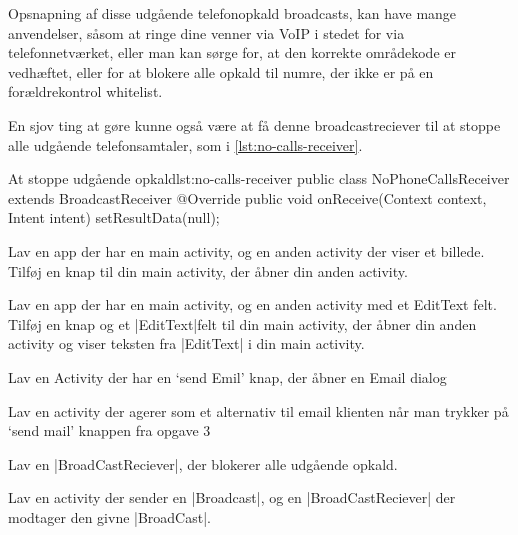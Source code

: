 Opsnapning af disse udgående telefonopkald broadcasts, kan have mange anvendelser, såsom at ringe dine venner via VoIP i stedet for via telefonnetværket, eller man kan sørge for, at den korrekte områdekode er vedhæftet, eller for at blokere alle opkald til numre, der ikke er på en forældrekontrol whitelist.

En sjov ting at gøre kunne også være at få denne broadcastreciever til at stoppe alle udgående telefonsamtaler, som i \autoref{lst:no-calls-receiver}.

\begin{JavaCode}{At stoppe udgående opkald}{lst:no-calls-receiver}
	public class NoPhoneCallsReceiver extends BroadcastReceiver {
		@Override
		public void onReceive(Context context, Intent intent) {
			setResultData(null);
		}
	}
\end{JavaCode}

\begin{exercise}
	Lav en app der har en main activity, og en anden activity der viser et billede. Tilføj en knap til din main activity, der åbner din anden activity.
\end{exercise}

\begin{exercise}
	Lav en app der har en main activity, og en anden activity med et EditText felt. Tilføj en knap og et \JavaInline|EditText|felt til din main activity, der åbner din anden activity og viser teksten fra \JavaInline|EditText| i din main activity.
\end{exercise}

\begin{exercise}
	Lav en Activity der har en ‘send Emil’ knap, der åbner en Email dialog
\end{exercise}

\begin{exercise}
	Lav en activity der agerer som et alternativ til email klienten når man trykker på ‘send mail’ knappen fra opgave 3
\end{exercise}

\begin{exercise}
	Lav en \JavaInline|BroadCastReciever|, der blokerer alle udgående opkald.
\end{exercise}

\begin{exercise}
	Lav en activity der sender en \JavaInline|Broadcast|, og en \JavaInline|BroadCastReciever| der modtager den givne \JavaInline|BroadCast|.
\end{exercise}

